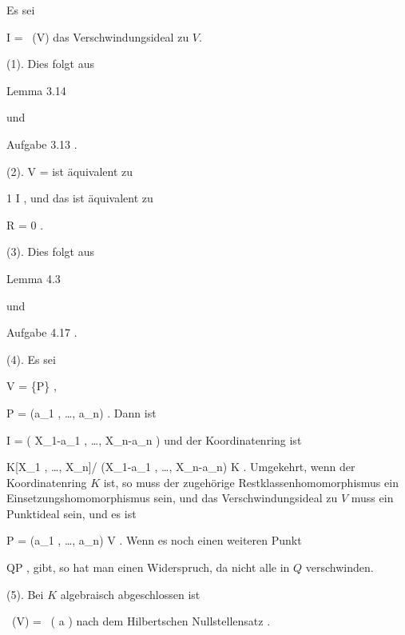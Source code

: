 {





Es sei

\mavergleichskette
{\vergleichskette
{ I
}
{ = }{  \, (V)
}
{  }{
}
{    }{
}
{   }{
}
}
{}{}{}
das Verschwindungsideal zu $V$.

(1). Dies folgt aus

Lemma 3.14

und

Aufgabe 3.13
.

(2).
\mavergleichskette
{\vergleichskette
{ V
}
{ = }{ \emptyset
}
{  }{
}
{    }{
}
{   }{
}
}
{}{}{}
ist äquivalent zu

\mavergleichskette
{\vergleichskette
{ 1
}
{ \in }{ I
}
{  }{
}
{    }{
}
{   }{
}
}
{}{}{,}
und das ist äquivalent zu

\mavergleichskette
{\vergleichskette
{ R
}
{ = }{ 0
}
{  }{
}
{    }{
}
{   }{
}
}
{}{}{.}

(3). Dies folgt aus

Lemma 4.3

und

Aufgabe 4.17
.

(4). Es sei

\mavergleichskette
{\vergleichskette
{ V
}
{ = }{ \{P\}
}
{  }{
}
{    }{
}
{   }{
}
}
{}{}{,}

\mavergleichskette
{\vergleichskette
{ P
}
{ = }{ (a_1 , \ldots ,  a_n)
}
{  }{
}
{    }{
}
{   }{
}
}
{}{}{.}
Dann ist

\mavergleichskette
{\vergleichskette
{ I
}
{ = }{ \left(  X_1-a_1 , \ldots ,  X_n-a_n  \right)
}
{  }{
}
{    }{
}
{   }{
}
}
{}{}{}
und der Koordinatenring ist

\mavergleichskettedisp
{\vergleichskette
{ K[X_1 , \ldots ,  X_n]/ (X_1-a_1 , \ldots ,  X_n-a_n)
}
{ \cong} { K
}
{ } {
}
{ } {
}
{ } {
}
}
{}{}{.}
Umgekehrt, wenn der Koordinatenring $K$ ist, so muss der zugehörige Restklassenhomomorphismus ein Einsetzungshomomorphismus
 sein, und das Verschwindungsideal zu $V$ muss ein Punktideal sein, und es ist

\mavergleichskette
{\vergleichskette
{ P
}
{ = }{ (a_1 , \ldots ,  a_n)
}
{ \in }{ V
}
{    }{
}
{   }{
}
}
{}{}{.}
Wenn es noch einen weiteren Punkt

 {}
 {Q\neq P} {}
 {} {} {} {,}
gibt, so hat man einen Widerspruch, da nicht alle
 in $Q$ verschwinden.

(5). Bei $K$ algebraisch abgeschlossen ist

\mavergleichskette
{\vergleichskette
{  \, (V)
}
{ = }{  \, ( {\mathfrak a} )
}
{  }{
}
{    }{
}
{   }{
}
}
{}{}{}
nach dem
Hilbertschen Nullstellensatz
.




}






